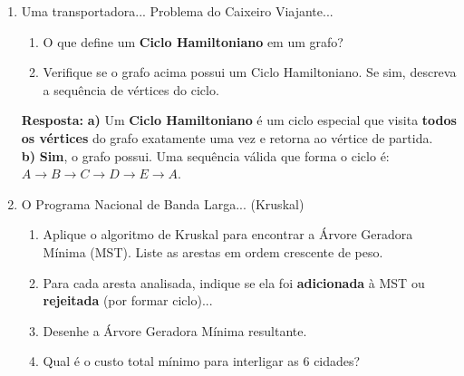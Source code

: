 \documentclass[12pt]{article}
\newcommand{\quadro}[1]{\vspace{0.2cm}\begin{tcolorbox}[colback=green!5, colframe=forestgreen, boxrule=0.5pt, arc=0pt] \textbf{Resposta:} #1 \end{tcolorbox}}
\begin{document}
\begin{enumerate}[label=\arabic*), leftmargin=1.5cm, itemsep=0.8cm]
\quadro{
\textbf{a)} Um \textbf{caminho} é qualquer sequência de arestas conectadas. Um \textbf{caminho simples} é um caminho que nunca repete vértices. \\
\textbf{b)} Um \textbf{ciclo} é um caminho simples de comprimento pelo menos 3 que começa e termina no mesmo vértice (forma um laço fechado sem repetir outros vértices intermediários). \\
\textbf{c)} \textbf{Não}. Por definição matemática, uma árvore livre é um grafo conexo e \textbf{acíclico}. Qualquer adição de aresta que crie um ciclo descaracteriza a estrutura como árvore.
}

\item Uma transportadora... Problema do Caixeiro Viajante...
\begin{enumerate}[label=\alph*)]
    \item O que define um \textbf{Ciclo Hamiltoniano} em um grafo?
    \item Verifique se o grafo acima possui um Ciclo Hamiltoniano. Se sim, descreva a sequência de vértices do ciclo.
\end{enumerate}

\quadro{
\textbf{a)} Um \textbf{Ciclo Hamiltoniano} é um ciclo especial que visita \textbf{todos os vértices} do grafo exatamente uma vez e retorna ao vértice de partida. \\
\textbf{b)} \textbf{Sim}, o grafo possui. Uma sequência válida que forma o ciclo é: $A \to B \to C \to D \to E \to A$.
}

\item O Programa Nacional de Banda Larga... (Kruskal)
\begin{enumerate}[label=\alph*)]
    \item Aplique o algoritmo de Kruskal para encontrar a Árvore Geradora Mínima (MST). Liste as arestas em ordem crescente de peso.
    \item Para cada aresta analisada, indique se ela foi \textbf{adicionada} à MST ou \textbf{rejeitada} (por formar ciclo)...
    \item Desenhe a Árvore Geradora Mínima resultante.
    \item Qual é o custo total mínimo para interligar as 6 cidades?
\end{enumerate}


\end{enumerate}
\end{document}
